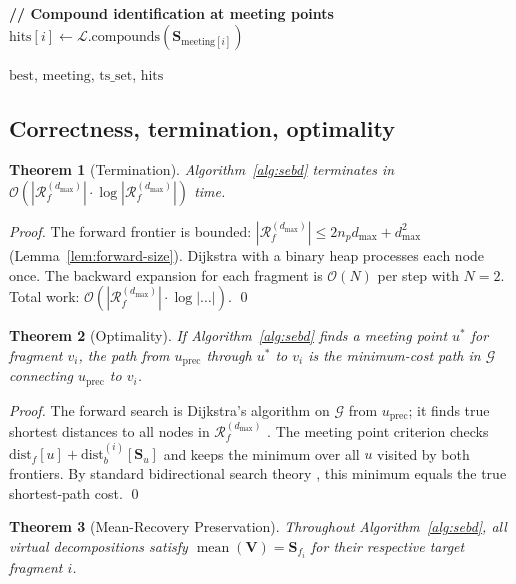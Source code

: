 \documentclass[twocolumn,10pt,a4paper]{article}
\theoremstyle{thmstyle}
\newtheorem{theorem}{Theorem}[section]
\theoremstyle{definition}
\theoremstyle{remark}
\newcommand{\Sv}{\mathbf{S}}
\newcommand{\calG}{\mathcal{G}}
\newcommand{\Reachf}{\mathcal{R}_f}
\DeclareMathOperator{\mean}{mean}
\begin{document}
\begin{algorithm}[t]
\begin{algorithmic}[1]
\State \textbf{// Compound identification at meeting points}
  \State $\text{hits}[i] \gets \mathcal{L}.\text{compounds}(\Sv_{\text{meeting}[i]})$
\EndFor

\Return $\text{best}$, $\text{meeting}$, $\text{ts\_set}$, $\text{hits}$
\end{algorithmic}
\end{algorithm}

\subsection{Correctness, termination, optimality}

\begin{theorem}[Termination]
\label{thm:termination}
Algorithm~\ref{alg:sebd} terminates in $\mathcal{O}(|\Reachf^{(d_\text{max})}| \cdot \log |\Reachf^{(d_\text{max})}|)$ time.
\end{theorem}

\begin{proof}
The forward frontier is bounded: $|\Reachf^{(d_\text{max})}| \leq
2n_p d_\text{max} + d_\text{max}^2$ (Lemma~\ref{lem:forward-size}).
Dijkstra with a binary heap processes each node once. The backward
expansion for each fragment is $\mathcal{O}(N)$ per step with $N = 2$.
Total work: $\mathcal{O}(|\Reachf^{(d_\text{max})}| \cdot \log|\ldots|)$.
\qed
\end{proof}

\begin{theorem}[Optimality]
\label{thm:optimality}
If Algorithm~\ref{alg:sebd} finds a meeting point $u^*$ for fragment
$v_i$, the path from $u_\text{prec}$ through $u^*$ to $v_i$ is the
minimum-cost path in $\calG$ connecting $u_\text{prec}$ to $v_i$.
\end{theorem}

\begin{proof}
The forward search is Dijkstra's algorithm on $\calG$ from
$u_\text{prec}$; it finds true shortest distances to all nodes in
$\Reachf^{(d_\text{max})}$ \citep{dijkstra1959}. The meeting point
criterion checks $\text{dist}_f[u] + \text{dist}_b^{(i)}[\Sv_u]$
and keeps the minimum over all $u$ visited by both frontiers.
By standard bidirectional search theory \citep{pohl1969,kaindl1997},
this minimum equals the true shortest-path cost. \qed
\end{proof}

\begin{theorem}[Mean-Recovery Preservation]
\label{thm:mean-recovery}
Throughout Algorithm~\ref{alg:sebd}, all virtual decompositions satisfy
$\mean(\mathbf{V}) = \Sv_{f_i}$ for their respective target fragment $i$.
\end{theorem}
\end{document}
